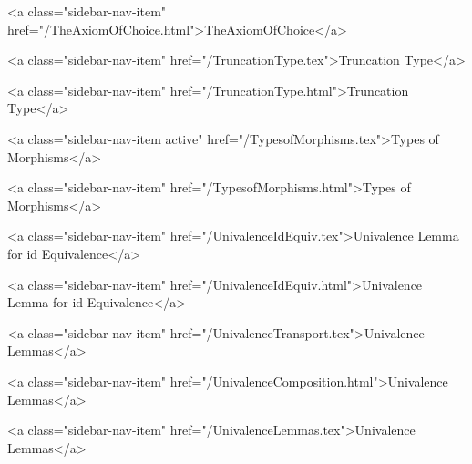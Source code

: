       
    
      
        
          <a class="sidebar-nav-item" href="/TheAxiomOfChoice.html">TheAxiomOfChoice</a>
        
      
    
      
        
          <a class="sidebar-nav-item" href="/TruncationType.tex">Truncation Type</a>
        
      
    
      
        
          <a class="sidebar-nav-item" href="/TruncationType.html">Truncation Type</a>
        
      
    
      
        
          <a class="sidebar-nav-item active" href="/TypesofMorphisms.tex">Types of Morphisms</a>
        
      
    
      
        
          <a class="sidebar-nav-item" href="/TypesofMorphisms.html">Types of Morphisms</a>
        
      
    
      
        
          <a class="sidebar-nav-item" href="/UnivalenceIdEquiv.tex">Univalence Lemma for id Equivalence</a>
        
      
    
      
        
          <a class="sidebar-nav-item" href="/UnivalenceIdEquiv.html">Univalence Lemma for id Equivalence</a>
        
      
    
      
        
          <a class="sidebar-nav-item" href="/UnivalenceTransport.tex">Univalence Lemmas</a>
        
      
    
      
        
          <a class="sidebar-nav-item" href="/UnivalenceComposition.html">Univalence Lemmas</a>
        
      
    
      
        
          <a class="sidebar-nav-item" href="/UnivalenceLemmas.tex">Univalence Lemmas</a>
        
      
    
      
        
